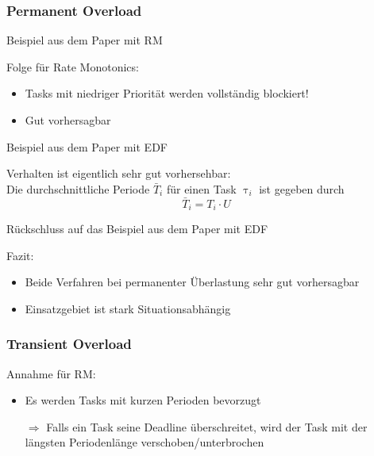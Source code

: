\subsubsection{Permanent Overload}
\begin{frame}{\subsubsecname}
	Beispiel aus dem Paper mit RM
\end{frame}

\begin{frame}{\subsubsecname}
	Folge für Rate Monotonics:
	\begin{itemize}
		\item Tasks mit niedriger Priorität werden vollständig blockiert!
		\item Gut vorhersagbar
	\end{itemize}
\end{frame}


\begin{frame}{\subsubsecname}
	Beispiel aus dem Paper mit EDF
\end{frame}


\begin{frame}{\subsubsecname}
	Verhalten ist eigentlich sehr gut vorhersehbar:\\
	Die durchschnittliche Periode $\bar{T}_i$ für einen Task $\uptau_i$ ist gegeben durch
	\begin{equation}
		\bar{T}_i=T_i\cdot U
	\end{equation}
\end{frame}

\begin{frame}{\subsubsecname}
	Rückschluss auf das Beispiel aus dem Paper mit EDF
\end{frame}

\begin{frame}{\subsubsecname}
	Fazit:
	\begin{itemize}
		\item Beide Verfahren bei permanenter Überlastung sehr gut vorhersagbar
		\item Einsatzgebiet ist stark Situationsabhängig
	\end{itemize}
\end{frame}

\subsubsection{Transient Overload}
\begin{frame}{\subsubsecname}
	Annahme für RM:
	\begin{itemize}
		\item Es werden Tasks mit kurzen Perioden bevorzugt\pause
		\item[$\Rightarrow$] Falls ein Task seine Deadline überschreitet, wird der Task mit der längsten Periodenlänge verschoben/unterbrochen	
	\end{itemize}
\end{frame}

